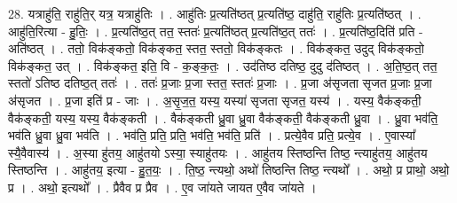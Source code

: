 \documentclass[17pt]{extarticle}
\begin{document}
28. यत्राहु॑ति॒ राहु॑ति॒र् यत्र॒ यत्राहु॑तिः । . आहु॑तिः प्र॒त्यति॑ष्ठत् प्र॒त्यति॑ष्ठ॒ दाहु॑ति॒ राहु॑तिः प्र॒त्यति॑ष्ठत् । . आहु॑ति॒रित्या - हु॒तिः॒ । . प्र॒त्यति॑ष्ठ॒त् तत॒ स्ततः॑ प्र॒त्यति॑ष्ठत् प्र॒त्यति॑ष्ठ॒त् ततः॑ । . प्र॒त्यति॑ष्ठ॒दिति॑ प्रति - अति॑ष्ठत् । . ततो॒ विक॑ङ्कतो॒ विक॑ङ्कत॒ स्तत॒ स्ततो॒ विक॑ङ्कतः । . विक॑ङ्कत॒ उदुद् विक॑ङ्कतो॒ विक॑ङ्कत॒ उत् । . विक॑ङ्कत॒ इति॒ वि - क॒ङ्क॒तः॒ । . उद॑तिष्ठ दतिष्ठ॒ दुदु द॑तिष्ठत् । . अ॒ति॒ष्ठ॒त् तत॒ स्ततो॑ ऽतिष्ठ दतिष्ठ॒त् ततः॑ । . ततः॑ प्र॒जाः प्र॒जा स्तत॒ स्ततः॑ प्र॒जाः । . प्र॒जा अ॑सृजता सृजत प्र॒जाः प्र॒जा अ॑सृजत । . प्र॒जा इति॑ प्र - जाः । . अ॒सृ॒ज॒त॒ यस्य॒ यस्या॑ सृजता सृजत॒ यस्य॑ । . यस्य॒ वैक॑ङ्कती॒ वैक॑ङ्कती॒ यस्य॒ यस्य॒ वैक॑ङ्कती । . वैक॑ङ्कती ध्रु॒वा ध्रु॒वा वैक॑ङ्कती॒ वैक॑ङ्कती ध्रु॒वा । . ध्रु॒वा भव॑ति॒ भव॑ति ध्रु॒वा ध्रु॒वा भव॑ति । . भव॑ति॒ प्रति॒ प्रति॒ भव॑ति॒ भव॑ति॒ प्रति॑ । . प्रत्ये॒वैव प्रति॒ प्रत्ये॒व । . ए॒वास्या᳚ स्यै॒वैवास्य॑ । . अ॒स्या हु॑तय॒ आहु॑तयो ऽस्या॒ स्याहु॑तयः । . आहु॑तय स्तिष्ठन्ति तिष्ठ॒ न्त्याहु॑तय॒ आहु॑तय स्तिष्ठन्ति । . आहु॑तय॒ इत्या - हु॒त॒यः॒ । . ति॒ष्ठ॒ न्त्यथो॒ अथो॑ तिष्ठन्ति तिष्ठ॒ न्त्यथो᳚ । . अथो॒ प्र प्राथो॒ अथो॒ प्र । . अथो॒ इत्यथो᳚ । . प्रैवैव प्र प्रैव । . ए॒व जा॑यते जायत ए॒वैव जा॑यते । \newline
\end{document}
